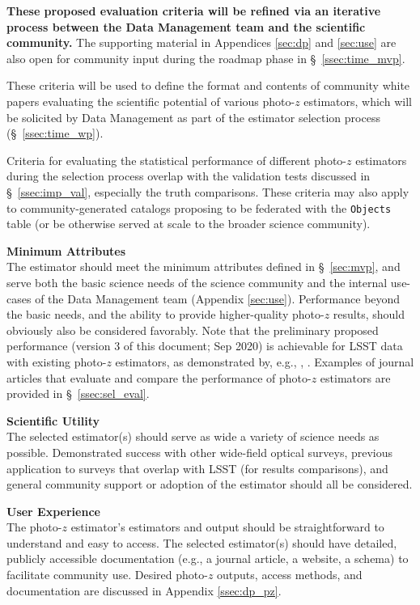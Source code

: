\documentclass[DM,lsstdraft,toc]{lsstdoc}
\begin{document}
\textbf{These proposed evaluation criteria will be refined via an iterative process between the Data Management team and the scientific community.} The supporting material in Appendices \ref{sec:dp} and \ref{sec:use} are also open for community input during the roadmap phase in \S~\ref{ssec:time_mvp}.

These criteria will be used to define the format and contents of community white papers evaluating the scientific potential of various photo-$z$ estimators, which will be solicited by Data Management as part of the estimator selection process (\S~\ref{ssec:time_wp}).

Criteria for evaluating the statistical performance of different photo-$z$ estimators during the selection process overlap with the validation tests discussed in \S~\ref{ssec:imp_val}, especially the truth comparisons.
These criteria may also apply to community-generated catalogs proposing to be federated with the {\tt Objects} table (or be otherwise served at scale to the broader science community).

{\bf Minimum Attributes}\\
The estimator should meet the minimum attributes defined in \S~\ref{sec:mvp}, and serve both the basic science needs of the science community and the internal use-cases of the Data Management team (Appendix \ref{sec:use}).
Performance beyond the basic needs, and the ability to provide higher-quality photo-$z$ results, should obviously also be considered favorably.
Note that the preliminary proposed performance (version 3 of this document; Sep 2020) is achievable for LSST data with existing photo-$z$ estimators, as demonstrated by, e.g., \citet{2018AJ....155....1G}, \citet{2020arXiv200103621S}.
Examples of journal articles that evaluate and compare the performance of photo-$z$ estimators are provided in \S~\ref{ssec:sel_eval}.

{\bf Scientific Utility}\\
The selected estimator(s) should serve as wide a variety of science needs as possible.
Demonstrated success with other wide-field optical surveys, previous application to surveys that overlap with LSST (for results comparisons), and general community support or adoption of the estimator should all be considered.

{\bf User Experience}\\
The photo-$z$ estimator's estimators and output should be straightforward to understand and easy to access.
The selected estimator(s) should have detailed, publicly accessible documentation (e.g., a journal article, a website, a schema) to facilitate community use.
Desired photo-$z$ outputs, access methods, and documentation are discussed in Appendix \ref{ssec:dp_pz}.
\end{document}
